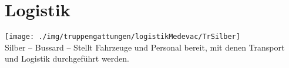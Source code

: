 \section{Logistik}
\texttt{[image: ./img/truppengattungen/logistikMedevac/TrSilber]}\\
Silber -- Bussard -- Stellt Fahrzeuge und Personal bereit, mit denen Transport und Logistik durchgeführt werden.